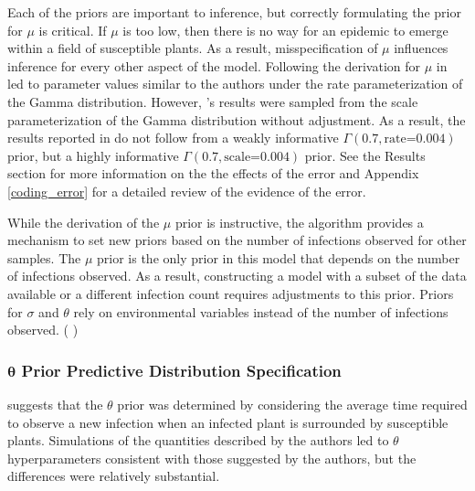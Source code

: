 \documentclass{uwstat572}
\newcommand{\vmcomment}[1]{({\color{blue}{VM's comment:}} \textbf{\color{blue}{#1}})}
\begin{document}
Each of the priors are important to inference, but correctly formulating the prior for $\mu$ is critical. 
If $\mu$ is too low, then there is no way for an epidemic to emerge within a field of susceptible plants. 
As a result, misspecification of $\mu$ influences inference for every other aspect of the model. 
Following the derivation for $\mu$ in \citet{Brown} led to parameter values similar to the authors under the rate parameterization of the Gamma distribution. 
However, \citep{Brown}'s results were sampled from the scale parameterization of the Gamma distribution without adjustment.
As a result, the results reported in \citet{Brown} do not follow from a weakly informative $\Gamma(0.7, \text{rate=}0.004)$ prior, but a highly informative $\Gamma(0.7, \text{scale=}0.004)$ prior. 
See the Results section for more information on the the effects of the error and Appendix \ref{coding_error} for a detailed review of the evidence of the error.  

While the derivation of the $\mu$ prior is instructive, the algorithm provides a mechanism to set new priors based on the number of infections observed for other samples. 
The $\mu$ prior is the only prior in this model that depends on the number of infections observed. 
As a result, constructing a model with a subset of the data available or a different infection count requires adjustments to this prior. 
Priors for $\sigma$ and $\theta$ rely on environmental variables instead of the number of infections observed.
\vmcomment{Not sure I understand what you mean by the ``environmental variables". Have you defined them before?}

\subsubsection{$\boldsymbol{\theta}$ Prior Predictive Distribution Specification}
\citet{Brown} suggests that the $\theta$ prior was determined by considering the average time required to observe a new infection when an infected plant is surrounded by susceptible plants. 
Simulations of the quantities described by the authors led to $\theta$ hyperparameters consistent with those suggested by the authors, but the differences were relatively substantial.
\end{document}

